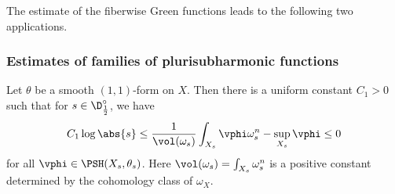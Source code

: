\documentclass[12pt]{amsart}
\begin{document}
The estimate of the fiberwise Green functions leads to the 
following two applications.

\subsubsection{Estimates of families of plurisubharmonic functions}

\begin{proposition}
    Let $\theta$ be a smooth $(1, 1)$-form on $X$. Then there is a 
    uniform constant $C_1 > 0$ such that for $s \in \D^{\circ}_{\frac{1}{2}}$, we have 
    \[
    C_1 \log\abs{s} \leq \frac{1}{\vol(\omega_s)}\int_{X_s} \vphi \omega_s^n  - \sup_{X_s} \vphi \leq 0
    \]
    for all $\vphi \in \PSH(X_s, \theta_s)$. Here $\vol(\omega_s) = \int_{X_s}\omega_s^n$ is a positive constant 
    determined by the cohomology class of $\omega_X$.
\end{proposition}
\end{document}
